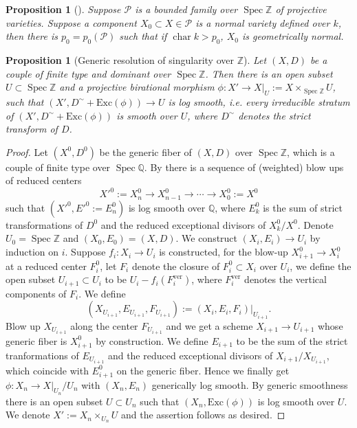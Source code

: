 \documentclass[letterpaper,reqno,12pt]{amsart}
\DeclareMathOperator{\Spec}{Spec}
\DeclareMathOperator{\chara}{char}
\numberwithin{equation}{section}
\theoremstyle{plain}
\newtheorem{proposition}[theorem]{Proposition}
\begin{document}
\begin{proposition}[{\cite[2.6]{complement1}}]\label{genorm}
    Suppose $\mathcal P$ is a bounded family over $\Spec\mathbb Z$ of projective varieties. Suppose a component $X_0\subset X\in\mathcal P$ is a normal variety defined over $k$, then there is $p_0=p_0(\mathcal P)$ such that if $\chara k>p_0$, $X_0$ is geometrically normal.
\end{proposition}

\begin{proposition}[Generic resolution of singularity over $\mathbb Z$]\label{genres}
    Let $(X,D)$ be a couple of finite type and dominant over $\Spec\mathbb Z$. Then there is an open subset $U\subset \Spec \mathbb Z$ and a projective birational morphism $\phi:X'\to X|_U:=X\times_{\Spec \mathbb Z} U$, such that $(X', D^\sim+\text{Exc}(\phi))\to U$ is log smooth, i.e. every irreducible stratum of $(X',D^\sim+\text{Exc}(\phi))$ is smooth over $U$, where $D^\sim$ denotes the strict transform of $D$.
\end{proposition}
\begin{proof}
    Let $(X^0,D^0)$ be the generic fiber of $(X,D)$ over $\Spec\mathbb Z$, which is a couple of finite type over $\Spec\mathbb Q$. By \cite[Theorem 1.4.1]{Resolution} there is a sequence of (weighted) blow ups of reduced centers 
    \[X'^0:=X^0_n\to X^0_{n-1}\to \cdots \to X^0_0:=X^0\]
    such that $(X'^0,E'^0:=E^0_n)$ is log smooth over $\mathbb Q$, where $E_k^0$ is the sum of strict transformations of $D^0$ and the reduced exceptional divisors of $X_k^0/X^0$. Denote $U_0=\Spec\mathbb Z$ and $(X_0,E_0)=(X,D)$. We construct $(X_i,E_i)\to U_i$ by induction on $i$. Suppose $f_i:X_i\to U_i$ is constructed, for the blow-up $X^0_{i+1}\to X_{i}^0$ at a reduced center $F_i^0$, let $F_i$ denote  the closure of $F_i^0\subset X_i$ over $U_i$, we define the open subset $U_{i+1} \subset U_i$ to be $U_i-f_i(F_i^{\text{ver}})$, where $F_i^\text{ver}$ denotes the vertical components of $F_i$. We define \[(X_{U_{i+1}},E_{U_{i+1}}, F_{U_{i+1}}):=(X_i,E_i,F_i)|_{U_{i+1}}.\] Blow up $X_{U_{i+1}}$ along the center $F_{U_{i+1}}$ and we get a scheme $X_{i+1}\to U_{i+1}$ whose generic fiber is $X_{i+1}^0$ by construction. We define $E_{i+1}$ to be the sum of the strict tranformations of $E_{U_{i+1}}$ and the reduced exceptional divisors of $X_{i+1}/X_{U_{i+1}}$, which coincide with $E^0_{i+1}$ on the generic fiber. Hence we finally get $\phi:X_n\to X|_{U_n}/ U_n$ with $(X_n, E_n)$ generically log smooth. By generic smoothness there is an open subset $U\subset U_n$ such that $(X_n, \text{Exc}(\phi))$ is log smooth over $U$. We denote $X':=X_n\times_{U_n}U$ and the assertion follows as desired.
\end{proof}
\end{document}
